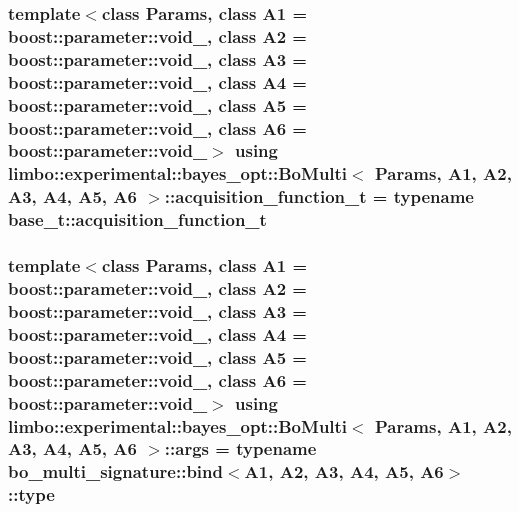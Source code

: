 \subsubsection[{\texorpdfstring{acquisition\+\_\+function\+\_\+t}{acquisition_function_t}}]{\setlength{\rightskip}{0pt plus 5cm}template$<$class Params, class A1 = boost\+::parameter\+::void\+\_\+, class A2 = boost\+::parameter\+::void\+\_\+, class A3 = boost\+::parameter\+::void\+\_\+, class A4 = boost\+::parameter\+::void\+\_\+, class A5 = boost\+::parameter\+::void\+\_\+, class A6 = boost\+::parameter\+::void\+\_\+$>$ using {\bf limbo\+::experimental\+::bayes\+\_\+opt\+::\+Bo\+Multi}$<$ Params, A1, A2, A3, A4, A5, A6 $>$\+::{\bf acquisition\+\_\+function\+\_\+t} =  typename {\bf base\+\_\+t\+::acquisition\+\_\+function\+\_\+t}}\hypertarget{classlimbo_1_1experimental_1_1bayes__opt_1_1_bo_multi_aa9e161c2d3b75329a8470204c32f1458}{}\label{classlimbo_1_1experimental_1_1bayes__opt_1_1_bo_multi_aa9e161c2d3b75329a8470204c32f1458}
\subsubsection[{\texorpdfstring{args}{args}}]{\setlength{\rightskip}{0pt plus 5cm}template$<$class Params, class A1 = boost\+::parameter\+::void\+\_\+, class A2 = boost\+::parameter\+::void\+\_\+, class A3 = boost\+::parameter\+::void\+\_\+, class A4 = boost\+::parameter\+::void\+\_\+, class A5 = boost\+::parameter\+::void\+\_\+, class A6 = boost\+::parameter\+::void\+\_\+$>$ using {\bf limbo\+::experimental\+::bayes\+\_\+opt\+::\+Bo\+Multi}$<$ Params, A1, A2, A3, A4, A5, A6 $>$\+::{\bf args} =  typename bo\+\_\+multi\+\_\+signature\+::bind$<$A1, A2, A3, A4, A5, A6$>$\+::type}\hypertarget{classlimbo_1_1experimental_1_1bayes__opt_1_1_bo_multi_a9ab4aaa59b6c7495da8e0220622efdea}{}\label{classlimbo_1_1experimental_1_1bayes__opt_1_1_bo_multi_a9ab4aaa59b6c7495da8e0220622efdea}
